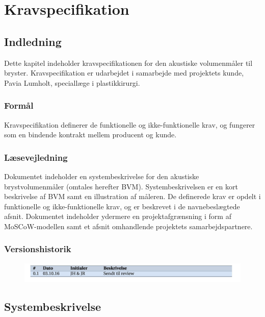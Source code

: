 
\chapter{Kravspecifikation}
\label{Kravspec}
	\section{Indledning}
	Dette kapitel indeholder kravspecifikationen for den akustiske volumenmåler til bryster. Kravspecifikation er udarbejdet i samarbejde med projektets kunde, Pavia Lumholt, speciallæge i plastikkirurgi. 
	  
		\subsection{Formål}
		Kravspecifikation definerer de funktionelle og ikke-funktionelle krav, og fungerer som en bindende kontrakt mellem producent og kunde.
	
		\subsection{Læsevejledning}	
		Dokumentet indeholder en systembeskrivelse for den akustiske brystvolumenmåler (omtales herefter BVM). Systembeskrivelsen er en kort beskrivelse af BVM samt en illustration af måleren. De definerede krav er opdelt i funktionelle og ikke-funktionelle krav, og er beskrevet i de navnebeslægtede afsnit. Dokumentet indeholder ydermere en projektafgrænsning i form af MoSCoW-modellen samt et afsnit omhandlende projektets samarbejdspartnere.
		
		\subsection{Versionshistorik}
		
		\vspace{5mm}
		
			\begin{figure}[htb]
				\includegraphics[width=5in]{versionshisv01.png}
			\end{figure}
		
	\section{Systembeskrivelse}

